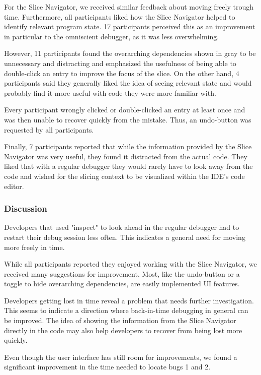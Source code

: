 \documentclass[
			english,
			review,
			]{elsarticle}
\begin{document}
For the Slice Navigator, we received similar feedback about moving freely trough time.
Furthermore, all participants liked how the Slice Navigator helped to identify relevant program state.
17 participants perceived this as an improvement in particular to the omniscient debugger, as it was less overwhelming.

However, 11 participants found the overarching dependencies shown in gray to be unnecessary and distracting and emphasized the usefulness of being able to double-click an entry to improve the focus of the slice.
On the other hand, 4 participants said they generally liked the idea of seeing relevant state and would probably find it more useful with code they were more familiar with.

Every participant wrongly clicked or double-clicked an entry at least once and was then unable to recover quickly from the mistake.
Thus, an undo-button was requested by all participants.

Finally, 7 participants reported that while the information provided by the Slice Navigator was very useful, they found it distracted from the actual code.
They liked that with a regular debugger they would rarely have to look away from the code and wished for the slicing context to be visualized within the IDE's code editor.

\subsubsection{Discussion}

Developers that used "inspect" to look ahead in the regular debugger had to restart their debug session less often.
This indicates a general need for moving more freely in time.

While all participants reported they enjoyed working with the Slice Navigator, we received many suggestions for improvement.
Most, like the undo-button or a toggle to hide overarching dependencies, are easily implemented UI features.

Developers getting lost in time reveal a problem that needs further investigation.
This seems to indicate a direction where back-in-time debugging in general can be improved.
The idea of showing the information from the Slice Navigator directly in the code may also help developers to recover from being lost more quickly.

Even though the user interface has still room for improvements, we found a significant improvement in the time needed to locate bugs 1 and 2.
\end{document}
